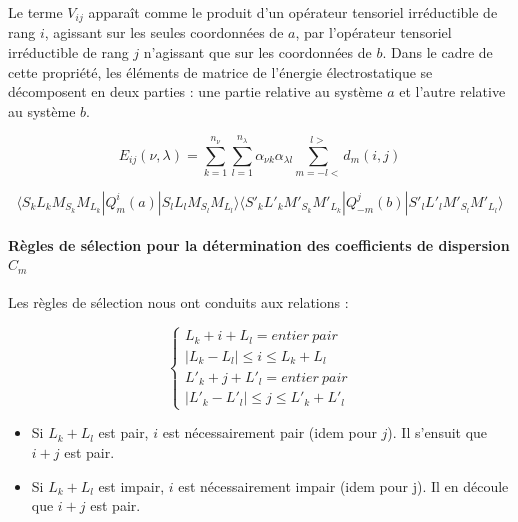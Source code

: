 	Le terme $V_{ij}$ apparaît comme le produit d'un opérateur tensoriel irréductible de rang $i$, agissant sur les seules coordonnées de $a$, par l'opérateur tensoriel irréductible de rang $j$ n'agissant que sur les coordonnées de $b$. Dans le cadre de cette propriété, les éléments de matrice de l'énergie électrostatique se décomposent en deux parties : une partie relative au système $a$ et l'autre relative au système $b$. 
	
	\begin{equation*}
	E_{ij}(\nu , \lambda)= \sum_{k=1}^{n_{\nu}} \sum_{l=1}^{n_{\lambda}} \alpha_{\nu k} \alpha_{\lambda l} \sum_{m=-l<}^{l>} d_{m}(i,j)
	\end{equation*}
	
	\begin{equation}
	\langle S_{k}L_{k}M_{S_{k}}M_{L_{k}}| Q_{m}^{i} (a)| S_{l}L_{l}M_{S_{l}}M_{L_{l}}\rangle \langle S'_{k}L'_{k}M'_{S_{k}}M'_{L_{k}}| Q_{-m}^{j} (b) | S'_{l}L'_{l}M'_{S_{l}}M'_{L_{l}}\rangle
	\end{equation}
	
	\paragraph{Règles de sélection pour la détermination des coefficients de dispersion $C_{m}$}
	
	Les règles de sélection nous ont conduits aux relations :
	
	\begin{equation}
	\begin{cases}
	L_{k} + i + L_{l} = entier\ pair \\
	|L_{k} - L_{l}| \leq i \leq L_{k} + L_{l} \\
	L'_{k} + j + L'_{l} = entier\ pair \\
	|L'_{k} - L'_{l}| \leq j \leq L'_{k} + L'_{l}
	\end{cases}
	\end{equation}
	
	\begin{itemize}
		\item Si $L_{k} + L_{l}$ est pair, $i$ est nécessairement pair (idem pour $j$). Il s'ensuit que $i + j$ est pair.	
		\item Si $L_{k} + L_{l}$ est impair, $i$ est nécessairement impair (idem pour j). Il en découle que $i + j$ est pair.
	\end{itemize}
	
